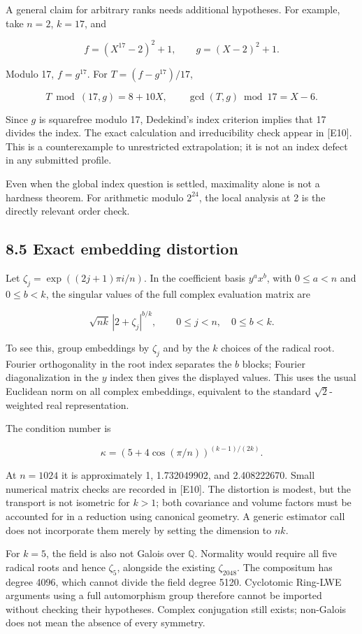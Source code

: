 \documentclass[
  american,
  10pt,
  a4paper,
]{article}
\begin{document}
A general claim for arbitrary ranks needs additional hypotheses. For
example, take \(n=2\), \(k=17\), and

\[
f=(X^{17}-2)^2+1,\qquad g=(X-2)^2+1.
\]

Modulo 17, \(f=g^{17}\). For \(T=(f-g^{17})/17\),

\[
T\bmod(17,g)=8+10X,\qquad
\gcd(T,g)\bmod17=X-6.
\]

Since \(g\) is squarefree modulo 17, Dedekind's index criterion implies
that 17 divides the index. The exact calculation and irreducibility
check appear in {[}E10{]}. This is a counterexample to unrestricted
extrapolation; it is not an index defect in any submitted profile.

Even when the global index question is settled, maximality alone is not
a hardness theorem. For arithmetic modulo \(2^{24}\), the local analysis
at 2 is the directly relevant order check.

\subsection{8.5 Exact embedding
distortion}\label{exact-embedding-distortion}

Let \(\zeta_j=\exp((2j+1)\pi i/n)\). In the coefficient basis
\(y^a x^b\), with \(0\leq a<n\) and \(0\leq b<k\), the singular values
of the full complex evaluation matrix are

\[
\sqrt{nk}\,|2+\zeta_j|^{b/k},
\qquad 0\leq j<n,\quad0\leq b<k.
\]

To see this, group embeddings by \(\zeta_j\) and by the \(k\) choices of
the radical root. Fourier orthogonality in the root index separates the
\(b\) blocks; Fourier diagonalization in the \(y\) index then gives the
displayed values. This uses the usual Euclidean norm on all complex
embeddings, equivalent to the standard \(\sqrt2\)-weighted real
representation.

The condition number is

\[
\kappa=(5+4\cos(\pi/n))^{(k-1)/(2k)}.
\]

At \(n=1024\) it is approximately 1, 1.732049902, and 2.408222670. Small
numerical matrix checks are recorded in {[}E10{]}. The distortion is
modest, but the transport is not isometric for \(k>1\); both covariance
and volume factors must be accounted for in a reduction using canonical
geometry. A generic estimator call does not incorporate them merely by
setting the dimension to \(nk\).

For \(k=5\), the field is also not Galois over \(\mathbb Q\). Normality
would require all five radical roots and hence \(\zeta_5\), alongside
the existing \(\zeta_{2048}\). The compositum has degree 4096, which
cannot divide the field degree 5120. Cyclotomic Ring-LWE arguments using
a full automorphism group therefore cannot be imported without checking
their hypotheses. Complex conjugation still exists; non-Galois does not
mean the absence of every symmetry.
\end{document}
